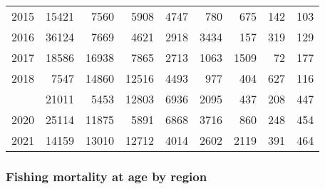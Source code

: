 \documentclass[
]{article}
\begin{document}
\begin{longtable}[t]{lrrrrrrrr}
2015 & 15421 & 7560 & 5908 & 4747 & 780 & 675 & 142 & 103\\
2016 & 36124 & 7669 & 4621 & 2918 & 3434 & 157 & 319 & 129\\
2017 & 18586 & 16938 & 7865 & 2713 & 1063 & 1509 & 72 & 177\\
2018 & 7547 & 14860 & 12516 & 4493 & 977 & 404 & 627 & 116\\
\addlinespace
2019 & 21011 & 5453 & 12803 & 6936 & 2095 & 437 & 208 & 447\\
2020 & 25114 & 11875 & 5891 & 6868 & 3716 & 860 & 248 & 454\\
2021 & 14159 & 13010 & 12712 & 4014 & 2602 & 2119 & 391 & 464\\*
\end{longtable}

\hypertarget{fishing-mortality-at-age-by-region}{%
\subsubsection{Fishing mortality at age by
region}\label{fishing-mortality-at-age-by-region}}
\end{document}
